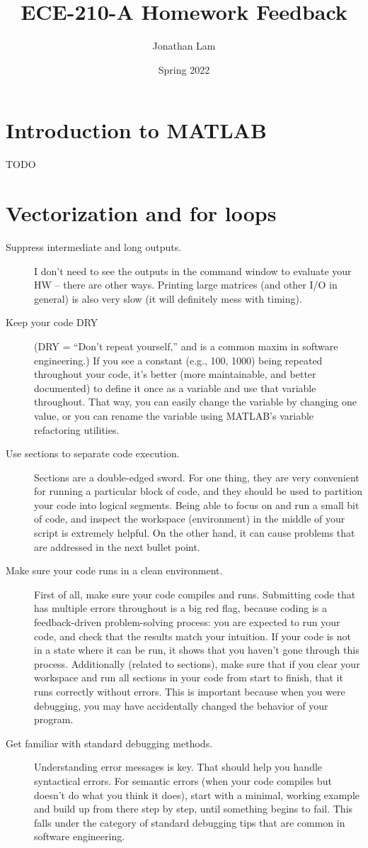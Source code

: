 \documentclass{article}
\title{ECE-210-A Homework Feedback}
\author{Jonathan Lam}
\date{Spring 2022}
\begin{document}
\maketitle{}

\section{Introduction to MATLAB}
\label{sec:hw1}

TODO

\section{Vectorization and for loops}
\label{sec:hw2}

\begin{description}
\item[Suppress intermediate and long outputs.] I don't need to see the outputs in the command window to evaluate your HW -- there are other ways. Printing large matrices (and other I/O in general) is also very slow (it will definitely mess with timing).
\item[Keep your code DRY] (DRY = ``Don't repeat yourself,'' and is a common maxim in software engineering.) If you see a constant (e.g., 100, 1000) being repeated throughout your code, it's better (more maintainable, and better documented) to define it once as a variable and use that variable throughout. That way, you can easily change the variable by changing one value, or you can rename the variable using MATLAB's variable refactoring utilities.
\item[Use sections to separate code execution.] Sections are a double-edged sword. For one thing, they are very convenient for running a particular block of code, and they should be used to partition your code into logical segments. Being able to focus on and run a small bit of code, and inspect the workspace (environment) in the middle of your script is extremely helpful. On the other hand, it can cause problems that are addressed in the next bullet point.
\item[Make sure your code runs in a clean environment.] First of all, make sure your code compiles and runs. Submitting code that has multiple errors throughout is a big red flag, because coding is a feedback-driven problem-solving process: you are expected to run your code, and check that the results match your intuition. If your code is not in a state where it can be run, it shows that you haven't gone through this process. Additionally (related to sections), make sure that if you clear your workspace and run all sections in your code from start to finish, that it runs correctly without errors. This is important because when you were debugging, you may have accidentally changed the behavior of your program.
\item[Get familiar with standard debugging methods.] Understanding error messages is key. That should help you handle syntactical errors. For semantic errors (when your code compiles but doesn't do what you think it does), start with a minimal, working example and build up from there step by step, until something begins to fail. This falls under the category of standard debugging tips that are common in software engineering.
\end{description}
\end{document}
